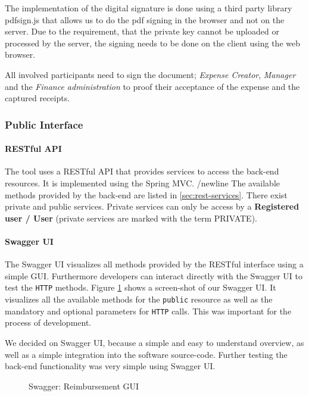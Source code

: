 The implementation of the digital signature is done using a third party library pdfsign.js \cite{pdfsign} that allows us to do the pdf signing in the browser and not on the server. Due to the requirement, that the private key cannot be uploaded or processed by the server, the signing needs to be done on the client using the web browser.\par

All involved participants need to sign the document; \textit{Expense Creator}, \textit{Manager} and the \textit{Finance administration} to proof their acceptance of the expense and the captured receipts. \par

\subsubsection{Public Interface}

\paragraph{RESTful API}
\label{sec:restfulapi}
The tool uses a RESTful API that provides services to access the back-end resources. It is implemented using the Spring MVC. /newline
The available methods provided by the back-end are listed in \ref{sec:rest-services}. There exist private and public services. Private services can only be access by a \textbf{Registered user / User} (private services are marked with the term PRIVATE).

\paragraph{Swagger UI}
The Swagger UI visualizes all methods provided by the RESTful interface using a simple GUI. Furthermore developers can interact directly with the Swagger UI to test the \texttt{HTTP} methods. Figure \ref{fig:swagger01} shows a screen-shot of our Swagger UI. It visualizes all the available methods for the \texttt{public} resource as well as the mandatory and optional parameters for \texttt{HTTP} calls. This was important for the process of development. \cite{swagger} \par
We decided on Swagger UI, because a simple and easy to understand overview, as well as a simple integration into the software source-code. Further testing the back-end functionality was very simple using Swagger UI.

\begin{figure}[H]
	\centering
	\caption{Swagger: Reimbursement GUI}
	\label{fig:swagger01}
\end{figure}

